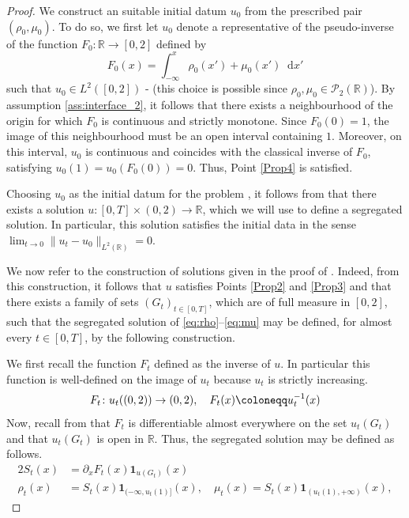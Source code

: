 \documentclass[a4paper,twosided, 11pt]{article}
\newcommand{\R}{\mathbb{R}}
\theoremstyle{plain}
\theoremstyle{remark}
\newcommand{\one}{\mathbf{1}}
\newcommand{\diff}{\mathop{} \mathrm{d}}
\numberwithin{equation}{section}
\begin{document}
\begin{proof}
We construct an suitable initial datum $u_0$ from the prescribed pair $(\rho_0,\mu_0)$. 
To do so, we first let $u_0$ denote a representative of the pseudo-inverse of the function $F_0\colon \R \to [0,2]$ defined by
\[
F_0(x) = \int_{-\infty}^x \rho_0(x') + \mu_0(x') \diff x'
\]
such that $u_0 \in L^2([0,2])$ - (this choice is possible since $\rho_0, \mu_0 \in \mathscr{P}_2(\R)$). 
By assumption \ref{ass:interface_2}, it follows that there exists a neighbourhood of the origin for which $F_0$ is continuous and strictly monotone. 
Since $F_0(0)=1$, the image of this neighbourhood must be an open interval containing $1$. 
Moreover, on this interval, $u_0$ is continuous and coincides with the classical inverse of $F_0$, satisfying $u_0(1) = u_0(F_0(0)) = 0$. Thus, Point \ref{Prop4} is satisfied.

\medskip 

Choosing $u_0$ as the initial datum for the problem \cite[Proposition 6.1, Equation 6.1]{santambrogioschulz2026segregated}, it follows from \cite[Theorem 3.6]{santambrogioschulz2026segregated} that there exists a solution $u \colon [0,T]\times (0,2) \to \R$, which we will use to define a segregated solution. 
In particular, this solution satisfies the initial data in the sense $\lim_{t\to 0} \|u_t - u_0\|_{L^2(\R)} = 0$.

\medskip 

    We now refer to the construction of solutions given in the proof of \cite[Theorem 3.5; Section 7]{santambrogioschulz2026segregated}. 
    Indeed, from this construction, it follows that $u$ satisfies Points \ref{Prop2} and \ref{Prop3} and that there exists a family of sets $(G_t)_{t \in [0,T]}$, which are of full measure in $[0,2]$, such that the segregated solution of \eqref{eq:rho}--\eqref{eq:mu} may be defined, for almost every $t \in [0,T]$, by the following construction.
    
    \medskip 

    We first recall the function $F_t$ defined as the inverse of $u$. 
    In particular this function is well-defined on the image of $u_t$ because $u_t$ is strictly increasing.
    \begin{equation}\label{eq:F_t}
           F_t \colon u_t((0,2)) \to (0,2), \quad F_t(x) \coloneqq u_t^{-1}(x)\\
    \end{equation}
    Now, recall from \cite[Proof of Theorem 3.5]{santambrogioschulz2026segregated} that $F_t$ is differentiable almost everywhere on the set $u_t(G_t)$ and that $u_t(G_t)$ is open in $\R$. 
    Thus, the segregated solution may be defined as follows.
    \begin{alignat}{2}
        S_t(x) & = \partial_x F_t(x)\one_{u(G_t)}(x)  \label{eq:St} \\
       \rho_t(x) & = S_t(x) \one_{(-\infty, u_t(1)]}(x),   \quad  \mu_t(x) = S_t(x) \one_{(u_t(1),+\infty)}(x), \label{eq:rho_tmu_t}
    \end{alignat}
\end{proof}
\end{document}
